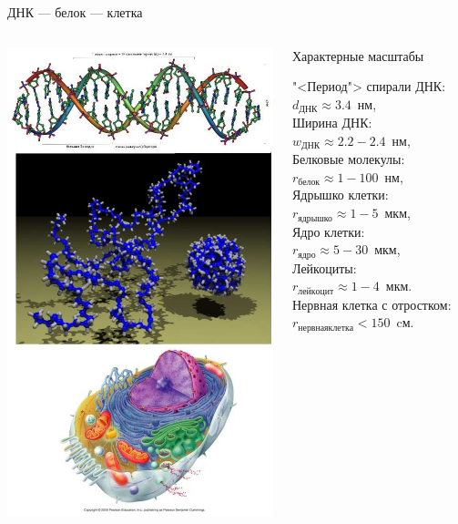 \documentclass[9pt, compress, xcolor=table]{beamer}
\begin{document}
\begin{frame}{ДНК --- белок --- клетка}
\begin{columns}[c]

\column{1.7in}
\begin{center}
\includegraphics[scale=0.8]{DNA-protein-cell-short}
\end{center}

\column{2.1in}
\begin{block}{Характерные масштабы}

"<Период"> спирали ДНК: \\
$d_{\text{ДНК}}\approx3.4$~нм, \\
Ширина ДНК: \\
$w_{\text{ДНК}}\approx2.2-2.4$~нм, \\
Белковые молекулы:\\
$r_{\text{белок}}\approx1-100$~нм, \\
Ядрышко клетки: \\
$r_{\text{ядрышко}}\approx1-5$~мкм, \\
Ядро клетки: \\
$r_{ядро}\approx5-30$~мкм, \\
Лейкоциты: \\
$r_{лейкоцит}\approx1-4$~мкм.\\
Нервная клетка с отростком: \\
$r_{нервная клетка}<150$~cм.
\end{block}
\end{columns}
\end{frame}
\end{document}
